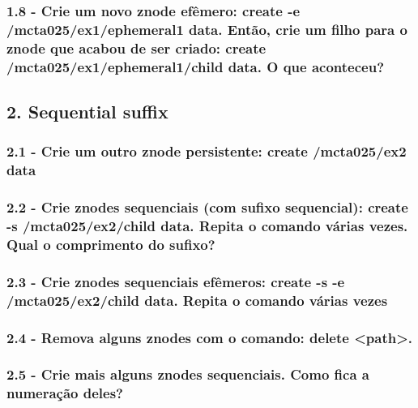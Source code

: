 \subsubsection{1.8 - Crie um novo znode efêmero: create -e /mcta025/ex1/ephemeral1 data. Então, crie um filho para o znode que acabou de ser criado: create /mcta025/ex1/ephemeral1/child data. O que aconteceu?}

\subsection*{2. Sequential suffix}

\subsubsection{2.1 - Crie um outro znode persistente: create /mcta025/ex2 data}

\subsubsection{2.2 - Crie znodes sequenciais (com sufixo sequencial): create -s
/mcta025/ex2/child data. Repita o comando várias vezes. Qual o
comprimento do sufixo?}

\subsubsection{2.3 - Crie znodes sequenciais efêmeros: create -s -e
/mcta025/ex2/child data. Repita o comando várias vezes}

\subsubsection{2.4 - Remova alguns znodes com o comando: delete <path>.}

\subsubsection{2.5 - Crie mais alguns znodes sequenciais. Como fica a numeração deles?}

